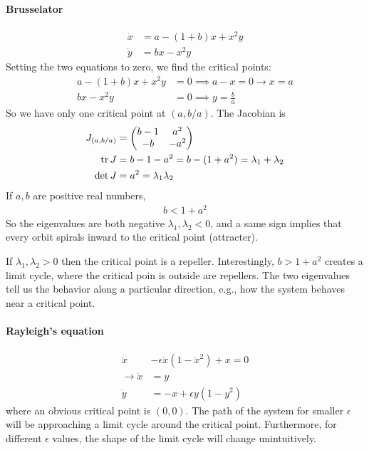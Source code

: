 \documentclass[../main.tex]{subfiles}
\begin{document}
\paragraph*{Brusselator}
\begin{align*}
    \dot x &= a - (1 + b) x + x^2 y \\
    \dot y &= bx - x^2 y
\end{align*}
Setting the two equations to zero, we find the critical points:
\begin{align*}
    a - (1 + b) x + x^2 y &= 0 \implies a - x = 0 \to x = a \\
    bx - x^2 y &= 0 \implies y = \frac{b}{a}
\end{align*}
So we have only one critical point at $(a, b/a)$. The Jacobian is
\begin{align*}
    J_{(a, b/a)} &= \mqty(b - 1 & a^2 \\ -b & -a^2) \\
    \tr J &= b - 1 - a^2 = b - (1 + a^2) = \lambda_1 + \lambda_2 \\
    \det J &= a^2 = \lambda_1 \lambda_2
\end{align*}
If $a,b$ are positive real numbers,
\begin{align*}
    b < 1 + a^2
\end{align*}
So the eigenvalues are both negative $\lambda_1, \lambda_2 < 0$, and a same sign
implies that every orbit spirals inward to the critical point (attracter). 

If $\lambda_1, \lambda_2 >0$ then the critical point is a repeller. Interestingly,
$b > 1 + a^2$ creates a limit cycle, where the critical poin is outside are repellers.
The two eigenvalues tell us the behavior along a particular direction, e.g., how the system behaves
near a critical point. 

\paragraph*{Rayleigh's equation}
\begin{align*}
    \ddot x &- \epsilon \dot x (1 - \dot x^2) + x = 0 \\
    \to \dot x &= y \\
    \dot y &= -x + \epsilon y(1 - y^2)
\end{align*}
where an obvious critical point is $(0,0)$. The path of the system for smaller $\epsilon$ will be
approaching a limit cycle around the critical point. Furthermore, for different $\epsilon$ values,
the shape of the limit cycle will change unintuitively.
\end{document}
